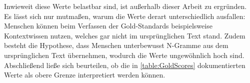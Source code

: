 \noindent
Inwieweit diese Werte belastbar sind, ist außerhalb dieser Arbeit zu ergründen. Es lässt sich nur mutmaßen, warum die Werte derart unterschiedlich ausfallen: Menschen können beim Verfassen der Gold-Standards beispielsweise Kontextwissen nutzen, welches gar nicht im ursprünglichen Text stand. Zudem besteht die Hypothese, dass Menschen unterbewusst N-Gramme aus dem ursprünglichen Text übernehmen, wodurch die Werte ungewöhnlich hoch sind. Abschließend ließe sich beurteilen, ob die in \autoref{table:GoldScores} dokumentierten Werte als obere Grenze interpretiert werden können.
